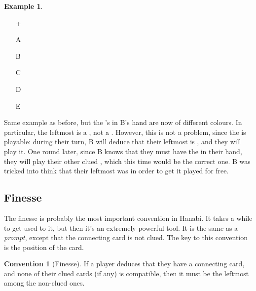 \documentclass[a4paper]{article}
\theoremstyle{plain}
\theoremstyle{definition}
\newtheorem{example}[theorem]{Example}
\newtheorem{convention}[theorem]{Convention}
\begin{document}
\begin{example} \hfill \\
	\begin{minipage}{0.45\textwidth}
		\begin{itemize}
			\item[\Large +]      
			\item[\Large A]    
			\item[\Large B]    
			\item[\Large C]    
			\item[\Large D]    
			\item[\Large E]    
		\end{itemize}
	\end{minipage}%
	\begin{minipage}{0.55\textwidth}
		Same example as before, but the 's in B's hand are now of different colours. In particular, the leftmost is a , not a . However, this is not a problem, since the  is playable: during their turn, B will deduce that their leftmost  is , and they will play it. One round later, since B knows that they must have the  in their hand, they will play their other clued , which this time would be the correct one. B was tricked into think that their leftmost  was  in order to get it played for free.
	\end{minipage}
\end{example} \vspace{0.15 cm}

\subsection{Finesse}
\label{sec:finesse}

The finesse is probably the most important convention in Hanabi. It takes a while to get used to it, but then it's an extremely powerful tool. It is the same as a \emph{prompt}, except that the connecting card is not clued. The key to this convention is the position of the card.

\begin{convention}[Finesse]
	\label{finesse}
	If a player deduces that they have a connecting card, and none of their clued cards (if any) is compatible, then it must be the leftmost among the non-clued ones.
\end{convention}
\end{document}
